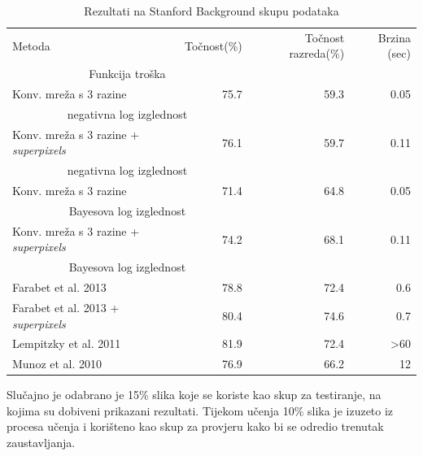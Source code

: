 \documentclass[times, utf8, diplomski, numeric]{fer}
\begin{document}
\begin{table}
\centering

\begin{adjustbox}{center}
\begin{tabular}{l r r r}
  Metoda & Točnost(\%) & Točnost razreda(\%) & Brzina (sec) \\
    \multicolumn{2}{c}{Funkcija troška} & & \\[0.6em] \hline

  Konv. mreža s 3 razine & 75.7 & 59.3 & 0.05 \\
    \multicolumn{2}{c}{negativna log izglednost} & & \\ \hline
  Konv. mreža s 3 razine + \textit{superpixels} & 76.1 & 59.7 & 0.11 \\
    \multicolumn{2}{c}{negativna log izglednost} & & \\ \hline
  Konv. mreža s 3 razine & 71.4 & 64.8 & 0.05 \\
    \multicolumn{2}{c}{Bayesova log izglednost} & & \\ \hline
  Konv. mreža s 3 razine + \textit{superpixels} & 74.2 & 68.1 & 0.11 \\
    \multicolumn{2}{c}{Bayesova log izglednost} & & \\ \hline \hline
    
  Farabet et al.\cite{farabet_pami} 2013 & 78.8 & 72.4 & 0.6 \\ \hline
  Farabet et al.\cite{farabet_pami} 2013 + \textit{superpixels} & 80.4 & 74.6 & 0.7 \\ \hline
  Lempitzky et al.\cite{lempitsky11} 2011 & 81.9 & 72.4 & >60 \\ \hline
  Munoz et al.\cite{munoz10} 2010 & 76.9 & 66.2 & 12
\end{tabular}
\end{adjustbox}

\caption{Rezultati na Stanford Background skupu podataka}
\end{table}

Slučajno je odabrano je 15\% slika koje se koriste kao skup za testiranje, na kojima su dobiveni prikazani rezultati. Tijekom učenja 10\% slika je izuzeto iz procesa učenja i korišteno kao skup za provjeru  kako bi se odredio trenutak zaustavljanja.
\end{document}
